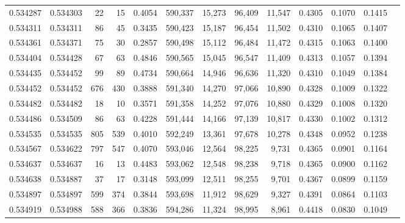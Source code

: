 \begin{tabular}{rrrrrrrrrrrrr}
0.534287 & 0.534303 &    22 &    15 &                                     0.4054 & 590,337 &  15,273 &  96,409 &  11,547 & 0.4305 & 0.1070 & 0.1415 \\
0.534311 & 0.534311 &    86 &    45 &                                     0.3435 & 590,423 &  15,187 &  96,454 &  11,502 & 0.4310 & 0.1065 & 0.1407 \\
0.534361 & 0.534371 &    75 &    30 &                                     0.2857 & 590,498 &  15,112 &  96,484 &  11,472 & 0.4315 & 0.1063 & 0.1400 \\
0.534404 & 0.534428 &    67 &    63 &                                     0.4846 & 590,565 &  15,045 &  96,547 &  11,409 & 0.4313 & 0.1057 & 0.1394 \\
0.534435 & 0.534452 &    99 &    89 &                                     0.4734 & 590,664 &  14,946 &  96,636 &  11,320 & 0.4310 & 0.1049 & 0.1384 \\
0.534452 & 0.534452 &   676 &   430 &                                     0.3888 & 591,340 &  14,270 &  97,066 &  10,890 & 0.4328 & 0.1009 & 0.1322 \\
0.534482 & 0.534482 &    18 &    10 &                                     0.3571 & 591,358 &  14,252 &  97,076 &  10,880 & 0.4329 & 0.1008 & 0.1320 \\
0.534486 & 0.534509 &    86 &    63 &                                     0.4228 & 591,444 &  14,166 &  97,139 &  10,817 & 0.4330 & 0.1002 & 0.1312 \\
0.534535 & 0.534535 &   805 &   539 &                                     0.4010 & 592,249 &  13,361 &  97,678 &  10,278 & 0.4348 & 0.0952 & 0.1238 \\
0.534567 & 0.534622 &   797 &   547 &                                     0.4070 & 593,046 &  12,564 &  98,225 &   9,731 & 0.4365 & 0.0901 & 0.1164 \\
0.534637 & 0.534637 &    16 &    13 &                                     0.4483 & 593,062 &  12,548 &  98,238 &   9,718 & 0.4365 & 0.0900 & 0.1162 \\
0.534638 & 0.534887 &    37 &    17 &                                     0.3148 & 593,099 &  12,511 &  98,255 &   9,701 & 0.4367 & 0.0899 & 0.1159 \\
0.534897 & 0.534897 &   599 &   374 &                                     0.3844 & 593,698 &  11,912 &  98,629 &   9,327 & 0.4391 & 0.0864 & 0.1103 \\
0.534919 & 0.534988 &   588 &   366 &                                     0.3836 & 594,286 &  11,324 &  98,995 &   8,961 & 0.4418 & 0.0830 & 0.1049 \\

\end{tabular}
